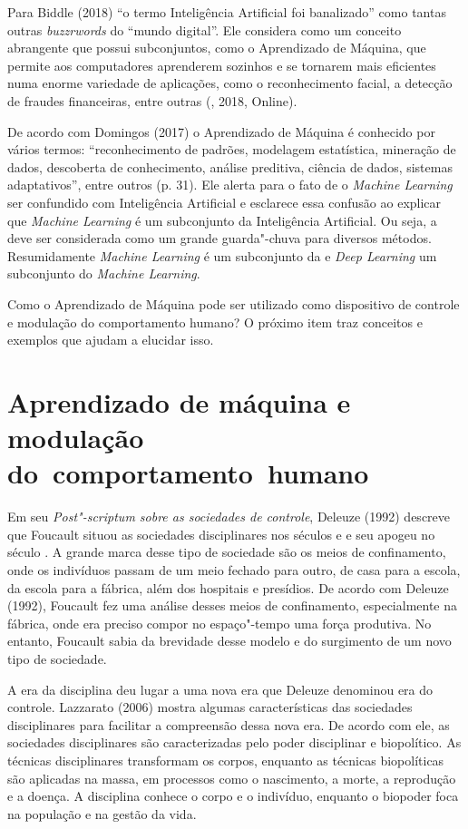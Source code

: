 Para Biddle (2018) ``o termo Inteligência Artificial foi banalizado''
como tantas outras \emph{buzzrwords} do ``mundo digital''. Ele considera
 como um conceito abrangente que possui subconjuntos, como o
Aprendizado de Máquina, que permite aos computadores aprenderem sozinhos
e se tornarem mais eficientes numa enorme variedade de aplicações, como
o reconhecimento facial, a detecção de fraudes financeiras, entre outras
(, 2018, Online).

De acordo com Domingos (2017) o Aprendizado de Máquina é conhecido por
vários termos: ``reconhecimento de padrões, modelagem estatística,
mineração de dados, descoberta de conhecimento, análise preditiva,
ciência de dados, sistemas adaptativos'', entre outros (p. 31). Ele
alerta para o fato de o \emph{Machine Learning} ser confundido com
Inteligência Artificial e esclarece essa confusão ao explicar que
\emph{Machine Learning} é um subconjunto da Inteligência Artificial. Ou
seja, a  deve ser considerada como um grande guarda"-chuva para
diversos métodos. Resumidamente \emph{Machine Learning} é um subconjunto
da  e \emph{Deep Learning} um subconjunto do \emph{Machine Learning}.

Como o Aprendizado de Máquina pode ser utilizado como dispositivo de
controle e modulação do comportamento humano? O próximo item traz
conceitos e exemplos que ajudam a elucidar isso.

\section{Aprendizado de máquina e modulação do~comportamento~humano}

Em seu \emph{Post"-scriptum sobre as sociedades de controle}, Deleuze
(1992) descreve que Foucault situou as sociedades disciplinares nos
séculos  e  e seu apogeu no século . A grande marca desse tipo
de sociedade são os meios de confinamento, onde os indivíduos passam de
um meio fechado para outro, de casa para a escola, da escola para a
fábrica, além dos hospitais e presídios. De acordo com Deleuze (1992),
Foucault fez uma análise desses meios de confinamento, especialmente na
fábrica, onde era preciso compor no espaço"-tempo uma força produtiva. No
entanto, Foucault sabia da brevidade desse modelo e do surgimento de um
novo tipo de sociedade.

A era da disciplina deu lugar a uma nova era que Deleuze denominou era
do controle. Lazzarato (2006) mostra algumas características das
sociedades disciplinares para facilitar a compreensão dessa nova era. De
acordo com ele, as sociedades disciplinares são caracterizadas pelo
poder disciplinar e biopolítico. As técnicas disciplinares transformam
os corpos, enquanto as técnicas biopolíticas são aplicadas na massa, em
processos como o nascimento, a morte, a reprodução e a doença. A
disciplina conhece o corpo e o indivíduo, enquanto o biopoder foca na
população e na gestão da vida.

